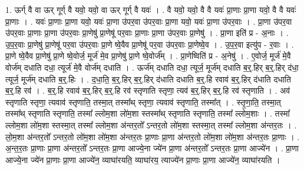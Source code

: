 \documentclass[17pt]{extarticle}
\begin{document}
1. ऊर्ग् वै वा ऊर् गूर्ग् वै यवो॒ यवो॒ वा ऊर् गूर्ग् वै यवः॑ । . वै यवो॒ यवो॒ वै वै यवः॑ प्रा॒णाः प्रा॒णा यवो॒ वै वै यवः॑ प्रा॒णाः । . यवः॑ प्रा॒णाः प्रा॒णा यवो॒ यवः॑ प्रा॒णा उ॑पर॒वा उ॑पर॒वाः प्रा॒णा यवो॒ यवः॑ प्रा॒णा उ॑पर॒वाः । . प्रा॒णा उ॑पर॒वा उ॑पर॒वाः प्रा॒णाः प्रा॒णा उ॑पर॒वाः प्रा॒णेषु॑ प्रा॒णेषू॑ पर॒वाः प्रा॒णाः प्रा॒णा उ॑पर॒वाः प्रा॒णेषु॑ । . प्रा॒णा इति॑ प्र - अ॒नाः । . उ॒प॒र॒वाः प्रा॒णेषु॑ प्रा॒णेषू॑ पर॒वा उ॑पर॒वाः प्रा॒णे ष्वे॒वैव प्रा॒णेषू॑ पर॒वा उ॑पर॒वाः प्रा॒णेष्वे॒व । . उ॒प॒र॒वा इत्यु॑प - र॒वाः । . प्रा॒णे ष्वे॒वैव प्रा॒णेषु॑ प्रा॒णे ष्वे॒वोर्ज॒ मूर्ज॑ मे॒व प्रा॒णेषु॑ प्रा॒णे ष्वे॒वोर्ज᳚म् । . प्रा॒णेष्विति॑ प्र - अ॒नेषु॑ । . ए॒वोर्ज॒ मूर्ज॑ मे॒वै वोर्ज॑म् दधाति दधा॒ त्यूर्ज॑ मे॒वै वोर्ज॑म् दधाति । . ऊर्ज॑म् दधाति दधा॒ त्यूर्ज॒ मूर्ज॑म् दधाति ब॒र्॒.हिर् ब॒र्॒.हिर् द॑धा॒ त्यूर्ज॒ मूर्ज॑म् दधाति ब॒र्॒.हिः । . द॒धा॒ति॒ ब॒र्॒.हिर् ब॒र्॒.हिर् द॑धाति दधाति ब॒र्॒.हि रवाव॑ ब॒र्॒.हिर् द॑धाति दधाति ब॒र्॒.हि रव॑ । . ब॒र्॒.हि रवाव॑ ब॒र्॒.हिर् ब॒र्॒.हि रव॑ स्तृणाति स्तृणा॒ त्यव॑ ब॒र्॒.हिर् ब॒र्॒.हि रव॑ स्तृणाति । . अव॑ स्तृणाति स्तृणा॒ त्यवाव॑ स्तृणाति॒ तस्मा॒त् तस्मा᳚थ् स्तृणा॒ त्यवाव॑ स्तृणाति॒ तस्मा᳚त् । . स्तृ॒णा॒ति॒ तस्मा॒त् तस्मा᳚थ् स्तृणाति स्तृणाति॒ तस्मा᳚ ल्लोम॒शा लो॑म॒शा स्तस्मा᳚थ् स्तृणाति स्तृणाति॒ तस्मा᳚
ल्लोम॒शाः । . तस्मा᳚ ल्लोम॒शा लो॑म॒शा स्तस्मा॒त् तस्मा᳚ ल्लोम॒शा अ॑न्तर॒तो᳚ ऽन्तर॒तो लो॑म॒शा स्तस्मा॒त् तस्मा᳚ ल्लोम॒शा अ॑न्तर॒तः । . लो॒म॒शा अ॑न्तर॒तो᳚ ऽन्तर॒तो लो॑म॒शा लो॑म॒शा अ॑न्तर॒तः प्रा॒णाः प्रा॒णा अ॑न्तर॒तो लो॑म॒शा लो॑म॒शा अ॑न्तर॒तः प्रा॒णाः । . अ॒न्त॒र॒तः प्रा॒णाः प्रा॒णा अ॑न्तर॒तो᳚ ऽन्तर॒तः प्रा॒णा आज्ये॒ना ज्ये॑न प्रा॒णा अ॑न्तर॒तो᳚ ऽन्तर॒तः प्रा॒णा आज्ये॑न । . प्रा॒णा आज्ये॒ना ज्ये॑न प्रा॒णाः प्रा॒णा आज्ये॑न॒ व्याघा॑रयति॒ व्याघा॑रय॒ त्याज्ये॑न प्रा॒णाः प्रा॒णा आज्ये॑न॒ व्याघा॑रयति । \newline
\end{document}
